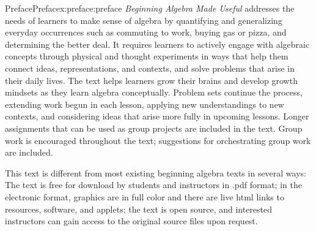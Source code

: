\documentclass[oneside,10pt,]{book}
\newcommand{\pubtitle}[1]{\textsl{#1}}
\numberwithin{equation}{chapter}
\begin{document}
\null\clearpage
%
%
\typeout{************************************************}
\typeout{************************************************}
%
\begin{preface}{Preface}{}{Preface}{}{}{x:preface:preface}
\pubtitle{Beginning Algebra Made Useful} addresses the needs of learners to make sense of algebra by quantifying and generalizing everyday occurrences such as commuting to work, buying gas or pizza, and determining the better deal.  It requires learners to actively engage with algebraic concepts through physical and thought experiments in ways that help them connect ideas, representations, and contexts, and solve problems that arise in their daily lives.  The text helps learners grow their brains and develop growth mindsets as they learn algebra conceptually.  Problem sets continue the process, extending work begun in each lesson, applying new understandings to new contexts, and considering ideas that arise more fully in upcoming lessons.  Longer assignments that can be used as group projects are included in the text. Group work is encouraged throughout the text; suggestions for orchestrating group work are included.%
\par
This text is different from most existing beginning algebra texts in several ways: The text is free for download by students and instructors in .pdf format; in the electronic format, graphics are in full color and there are live html links to resources, software, and applets; the text is open source, and interested instructors can gain access to the original source files upon request.%
\end{preface}
%
%
\typeout{************************************************}
\typeout{************************************************}
%
\end{document}
